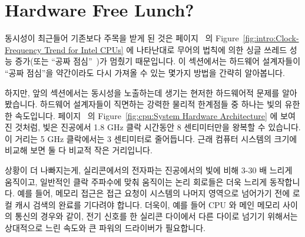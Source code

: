 
\section{Hardware Free Lunch?}
\label{sec:cpu:Hardware Free Lunch?}

동시성이 최근들어 기존보다 주목을 받게 된 것은
페이지~\pageref{fig:intro:Clock-Frequency Trend for Intel CPUs} 의
Figure~\ref{fig:intro:Clock-Frequency Trend for Intel CPUs} 에 나타난대로
무어의 법칙에 의한 싱글 쓰레드 성능 증가(또는 ``공짜
점심''~\cite{HerbSutter2008EffectiveConcurrency})가 멈췄기 때문입니다.
이 섹션에서는 하드웨어 설계자들이 ``공짜 점심''을 약간이라도 다시 가져올 수
있는 몇가지 방법을 간략히 알아봅니다.

\iffalse
The major reason that concurrency has been receiving so much focus over
the past few years is the end of Moore's-Law induced single-threaded
performance increases
(or ``free lunch''~\cite{HerbSutter2008EffectiveConcurrency}),
as shown in
Figure~\ref{fig:intro:Clock-Frequency Trend for Intel CPUs} on
page~\pageref{fig:intro:Clock-Frequency Trend for Intel CPUs}.
This section briefly surveys a few ways that hardware designers
might be able to bring back some form of the ``free lunch''.
\fi

하지만, 앞의 섹션에서는 동시성을 노출하는데 생기는 현저한 하드웨어적 문제를
알아봤습니다.
하드웨어 설계자들이 직면하는 강력한 물리적 한계점들 중 하나는 빛의 유한한
속도입니다.
페이지~\pageref{fig:cpu:System Hardware Architecture} 의
Figure~\ref{fig:cpu:System Hardware Architecture} 에 보여진 것처럼, 빛은
진공에서 1.8 GHz 클락 시간동안 8 센티미터만을 왕복할 수 있습니다.
이 거리는 5 GHz 클락에서는 3 센티미터로 줄어듭니다.
근래 컴퓨터 시스템의 크기에 비교해 보면 둘 다 비교적 작은 거리입니다.

\iffalse
However, the preceding section presented some substantial hardware
obstacles to exploiting concurrency.
One severe physical limitation that hardware designers face is the
finite speed of light.
As noted in
Figure~\ref{fig:cpu:System Hardware Architecture} on
page~\pageref{fig:cpu:System Hardware Architecture},
light can travel only about an 8-centimeters round trip
in a vacuum during the duration of a 1.8\,GHz clock period.
This distance drops to about 3~centimeters for a 5\,GHz clock.
Both of these distances are relatively small compared to the size
of a modern computer system.
\fi

상황이 더 나빠지는게, 실리콘에서의 전자파는 진공에서의 빛에 비해 3-30 배 느리게
움직이고, 일반적인 클락 주파수에 맞춰 움직이는 논리 회로들은 더욱 느리게
동작합니다. 예를 들어, 메모리 접근은 접근 요청이 시스템의 나머지 영역으로
넘어가기 전에 로컬 캐시 검색의 완료를 기다려야 합니다.
더욱이, 예를 들어 CPU 와 메인 메모리 사이의 통신의 경우와 같이, 전기 신호를 한
실리콘 다이에서 다른 다이로 넘기기 위해서는 상대적으로 느린 속도와 큰 파워의
드라이버가 필요합니다.

